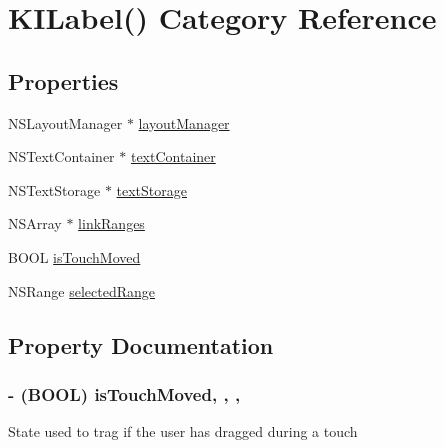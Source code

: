 \hypertarget{category_k_i_label_07_08}{}\section{K\+I\+Label() Category Reference}
\label{category_k_i_label_07_08}
\subsection*{Properties}
\begin{DoxyCompactItemize}
\item 
N\+S\+Layout\+Manager $\ast$ \hyperlink{category_k_i_label_07_08_acda5870155173d7ec0f25ed7c63db604}{layout\+Manager}
\item 
N\+S\+Text\+Container $\ast$ \hyperlink{category_k_i_label_07_08_a96015e7fd5df9ce588977b0ac889fef2}{text\+Container}
\item 
N\+S\+Text\+Storage $\ast$ \hyperlink{category_k_i_label_07_08_aaf49e47faa508062539d05e77394e64b}{text\+Storage}
\item 
N\+S\+Array $\ast$ \hyperlink{category_k_i_label_07_08_ab0294bf67c45caebe3f39e778be17c95}{link\+Ranges}
\item 
B\+O\+O\+L \hyperlink{category_k_i_label_07_08_a2985ac85a309356eab75e0557699478f}{is\+Touch\+Moved}
\item 
N\+S\+Range \hyperlink{category_k_i_label_07_08_af61ee72f15d84bb0f5869ce60f58537f}{selected\+Range}
\end{DoxyCompactItemize}


\subsection{Property Documentation}
\hypertarget{category_k_i_label_07_08_a2985ac85a309356eab75e0557699478f}{}
\subsubsection[{is\+Touch\+Moved}]{\setlength{\rightskip}{0pt plus 5cm}-\/ (B\+O\+O\+L) is\+Touch\+Moved\hspace{0.3cm}{\ttfamily [read]}, {\ttfamily [write]}, {\ttfamily [nonatomic]}, {\ttfamily [assign]}}\label{category_k_i_label_07_08_a2985ac85a309356eab75e0557699478f}
State used to trag if the user has dragged during a touch \hypertarget{category_k_i_label_07_08_acda5870155173d7ec0f25ed7c63db604}{}
